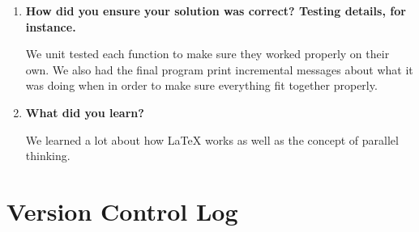 \documentclass[letterpaper,10pt,titlepage,draftclsnofoot,onecolumn]{IEEEtran}
\begin{document}
\begin{enumerate}
\item \textbf{How did you ensure your solution was correct? Testing details, for instance.}

We unit tested each function to make sure they worked properly on their own. We also had the final program print incremental messages about what it was doing when in order to make sure everything fit together properly. \par

\item \textbf{What did you learn?}

We learned a lot about how LaTeX works as well as the concept of parallel thinking. \par

\end{enumerate}

\section{Version Control Log}
\end{document}
